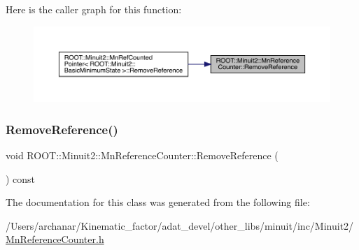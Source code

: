 Here is the caller graph for this function\+:\nopagebreak
\begin{figure}[H]
\begin{center}
\leavevmode
\includegraphics[width=350pt]{dc/da2/classROOT_1_1Minuit2_1_1MnReferenceCounter_a243db2ef8fc1fab0a29ea1c83aececab_icgraph}
\end{center}
\end{figure}
\mbox{\label{classROOT_1_1Minuit2_1_1MnReferenceCounter_a243db2ef8fc1fab0a29ea1c83aececab}} 
\subsubsection{\texorpdfstring{RemoveReference()}{RemoveReference()}\hspace{0.1cm}{\footnotesize\ttfamily [2/2]}}
{\footnotesize\ttfamily void R\+O\+O\+T\+::\+Minuit2\+::\+Mn\+Reference\+Counter\+::\+Remove\+Reference (\begin{DoxyParamCaption}{ }\end{DoxyParamCaption}) const\hspace{0.3cm}{\ttfamily [inline]}}



The documentation for this class was generated from the following file\+:\begin{DoxyCompactItemize}
\item 
/\+Users/archanar/\+Kinematic\+\_\+factor/adat\+\_\+devel/other\+\_\+libs/minuit/inc/\+Minuit2/\mbox{\hyperlink{other__libs_2minuit_2inc_2Minuit2_2MnReferenceCounter_8h}{Mn\+Reference\+Counter.\+h}}\end{DoxyCompactItemize}
